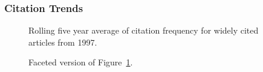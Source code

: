 \documentclass[
  10pt,
  letterpaper,
  DIV=11,
  numbers=noendperiod,
  twoside]{scrartcl}
\begin{document}
\subsubsection*{Citation Trends}\label{citation-trends-21}

\begin{figure}


\caption{\label{fig-citation-spaghetti-1997}Rolling five year average of
citation frequency for widely cited articles from 1997.}

\end{figure}%

\begin{figure}


\caption{\label{fig-citation-facet-1997}Faceted version of
Figure~\ref{fig-citation-spaghetti-1997}.}

\end{figure}%
\end{document}
